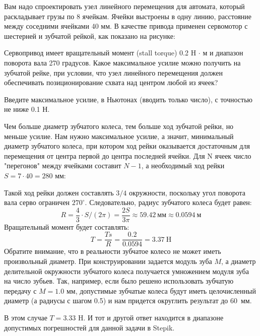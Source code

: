 
Вам надо спроектировать узел линейного перемещения для автомата, который раскладывает грузы по 8 ячейкам.  Ячейки выстроены в одну линию,  расстояние между соседними ячейками 40 мм.  В качестве привода применен сервомотор с шестерней и зубчатой рейкой, как показано на рисунке:


Сервопривод имеет вращательный момент (stall torque) 0.2 H $\cdot$ м  и диапазон поворота вала 270 градусов.  Какое максимальное усилие можно получить на зубчатой рейке, при условии, что узел линейного перемещения должен обеспечивать позиционирование схвата над центром любой из ячеек?   

Введите максимальное усилие, в Ньютонах (вводить только число),  с точностью не ниже 0.1 Н.

\solutionSection

Чем больше диаметр зубчатого колеса, тем больше ход зубчатой рейки, но меньше усилие. Нам нужно максимальное усилие, а значит, минимальный диаметр зубчатого колеса, при котором ход рейки оказывается достаточным для перемещения от центра первой до центра последней ячейки. Для N ячеек число "перегонов" между ячейками составит $N-1$,  а необходимый ход рейки $S = 7 \cdot 40 = 280$ мм:


Такой ход рейки должен составлять $3/4$  окружности, поскольку угол поворота вала серво ограничен $270^\circ$.  Следовательно, радиус зубчатого колеса будет равен:
$$R = \frac{4}{3} \cdot S / (2 \pi)= \frac{2 S}{3 \pi} \approx 59.42 \: \text{мм} \approx 0.0594 \: \text{м}$$
Вращательный момент будет составлять:
$$T = \frac{Ts}{R} = \frac{0.2}{0.0594} = 3.37 \: \text{H}$$
Обратите внимание, что в реальности зубчатое колесо не может иметь произвольный диаметр. При конструировании задается модуль зуба $M$, а диаметр делительной окружности зубчатого колеса получается умножением модуля зуба на число зубьев. Так, например, если было решено использовать зубчатую передачу с $M=1.0$ мм, допустимые зубчатые колеса будут иметь целочисленный диаметр (а радиусы с шагом 0.5) и нам придется округлить результат до 60~мм.  

В этом случае $T = 3.33$ H.  И тот и другой ответ находится в диапазоне допустимых погрешностей для данной задачи в Stepik.

